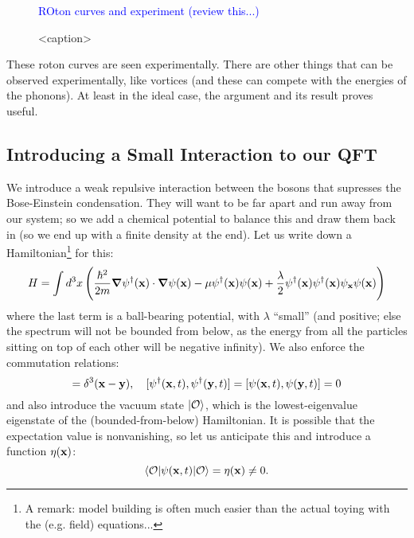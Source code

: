 \begin{figure}[htbp]
    \centering
    \textcolor{blue}{ROton curves and experiment (review this...)}
    \caption{<caption>}
    \label{<label>}
\end{figure}

These roton curves are seen experimentally. There are other things that can be observed experimentally, like vortices (and these can compete with the energies of the phonons). At least in the ideal case, the argument and its result proves useful.

\subsection{Introducing a Small Interaction to our QFT}
We introduce a weak repulsive interaction between the bosons that supresses the Bose-Einstein condensation. They will want to be far apart and run away from our system; so we add a chemical potential to balance this and draw them back in (so we end up with a finite density at the end). Let us write down a Hamiltonian\footnote{A remark: model building is often much easier than the actual toying with the (e.g. field) equations...} for this:
\begin{equation}
    H = \int d^3 x \left(\frac{\hbar^2}{2m}\nabla \psi^\dag(\v{x}) \cdot \nabla \psi(\v{x}) - \mu\psi^{\dag}(\v{x})\psi(\v{x}) + \frac{\lambda}{2}\psi^\dag(\v{x})\psi^{\dag}(\v{x})\psi_\v{x}\psi(\v{x})\right)
\end{equation}
where the last term is a ball-bearing potential, with $\lambda$ ``small'' (and positive; else the spectrum will not be bounded from below, as the energy from all the particles sitting on top of each other will be negative infinity). We also enforce the commutation relations:
\begin{equation}
    [\psi(\v{x}, t), \psi^{\dag}(\v{y}, t)] = \delta^3(\v{x} - \v{y}), \quad [\psi^\dag(\v{x}, t), \psi^{\dag}(\v{y}, t)] = [\psi(\v{x}, t), \psi(\v{y}, t)] = 0
\end{equation}
and also introduce the vacuum state $\lvert \mathcal{O} \rangle$, which is the lowest-eigenvalue eigenstate of the (bounded-from-below) Hamiltonian. It is possible that the expectation value is nonvanishing, so let us anticipate this and introduce a function $\eta(\mathbf{x})$:
\begin{equation}
    \langle \mathcal{O} \rvert\psi(\mathbf{x}, t)\lvert \mathcal{O} \rangle = \eta(\mathbf{x}) \neq 0.
\end{equation}

